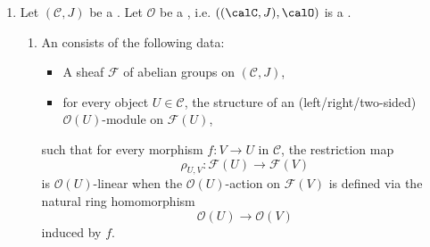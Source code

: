 \begin{definition}
\begin{enumerate}
\begin{enumerate}
            \item Let $\mathcal{M}$ and $\mathcal{N}$ be $(\mathcal{A}, \mathcal{B})$-bimodules. A  (or an ) is a morphism of sheaves of abelian groups $f: \mathcal{M} \to \mathcal{N}$ such that for every object $U$ of $\mathcal{C}$, every section $m \in \mathcal{M}(U)$, every $a \in \mathcal{A}(U)$, and every $b \in \mathcal{B}(U)$, the following compatibility conditions hold:
            $$ f_U(a \cdot m) = a \cdot f_U(m) \quad \text{and} \quad f_U(m \cdot b) = f_U(m) \cdot b. $$


        \end{enumerate}

        \noindent We denote the category of $(\mathcal{A}, \mathcal{B})$-bimodules, with morphisms being morphisms of sheaves of abelian groups compatible with both the left $\mathcal{A}$-action and the right $\mathcal{B}$-action, by
        \hl{$ \mathcal{A}\text{-}\mathcal{B}\text{-}\mathsf{Mod} $}
        or sometimes by
        \hl{$ {}_{\mathcal{A}}\mathsf{Mod}_{\mathcal{B}} $}

        \item 

        Let $(\mathcal{C}, J)$ be a . Let $\mathcal{O}$ be a , i.e. $((\calC, J), \calO)$ is a .  

        \begin{enumerate}
            \item An  consists of the following data:
            \begin{itemize}
                \item A sheaf $\mathcal{F}$ of abelian groups on $(\mathcal{C}, J)$,
            \item for every object $U \in \mathcal{C}$, the structure of an (left/right/two-sided) $\mathcal{O}(U)$-module on $\mathcal{F}(U)$,
            \end{itemize}
            such that for every morphism $f: V \to U$ in $\mathcal{C}$, the restriction map 
            $$\rho_{U,V}: \mathcal{F}(U) \to \mathcal{F}(V)$$ 
            is $\mathcal{O}(U)$-linear when the $\mathcal{O}(U)$-action on $\mathcal{F}(V)$ is defined via the natural ring homomorphism 
            $$\mathcal{O}(U) \to \mathcal{O}(V)$$
            induced by $f$.



\end{enumerate}
\end{enumerate}
\end{definition}
